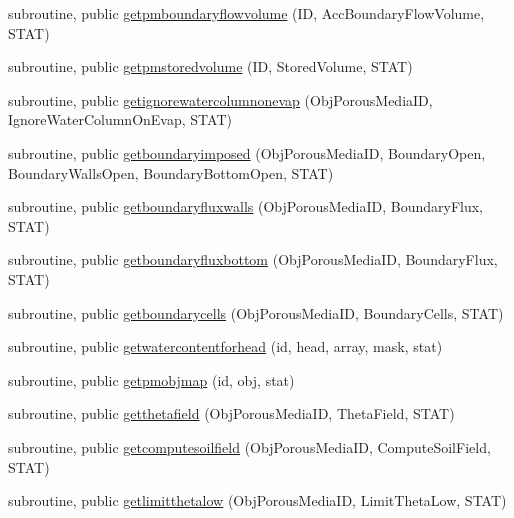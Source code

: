 \begin{DoxyCompactItemize}
\item 
subroutine, public \mbox{\hyperlink{namespacemoduleporousmedia_af76c86e60836074eb54ae108e4cbb7e5}{getpmboundaryflowvolume}} (ID, Acc\+Boundary\+Flow\+Volume, S\+T\+AT)
\item 
subroutine, public \mbox{\hyperlink{namespacemoduleporousmedia_a92e48a5d06b01af62070aecdf43d84e8}{getpmstoredvolume}} (ID, Stored\+Volume, S\+T\+AT)
\item 
subroutine, public \mbox{\hyperlink{namespacemoduleporousmedia_ab3b8a6941c7523cd30e46b5a95be57de}{getignorewatercolumnonevap}} (Obj\+Porous\+Media\+ID, Ignore\+Water\+Column\+On\+Evap, S\+T\+AT)
\item 
subroutine, public \mbox{\hyperlink{namespacemoduleporousmedia_a7ef0de747f82c7f61108e9f6033b260d}{getboundaryimposed}} (Obj\+Porous\+Media\+ID, Boundary\+Open, Boundary\+Walls\+Open, Boundary\+Bottom\+Open, S\+T\+AT)
\item 
subroutine, public \mbox{\hyperlink{namespacemoduleporousmedia_a50641f9d2c506813ba712d8f3ba6438d}{getboundaryfluxwalls}} (Obj\+Porous\+Media\+ID, Boundary\+Flux, S\+T\+AT)
\item 
subroutine, public \mbox{\hyperlink{namespacemoduleporousmedia_ad1e02ec3a85b11609df54fd2e561da0d}{getboundaryfluxbottom}} (Obj\+Porous\+Media\+ID, Boundary\+Flux, S\+T\+AT)
\item 
subroutine, public \mbox{\hyperlink{namespacemoduleporousmedia_a791a426544d46967cd83d7b81926e26a}{getboundarycells}} (Obj\+Porous\+Media\+ID, Boundary\+Cells, S\+T\+AT)
\item 
subroutine, public \mbox{\hyperlink{namespacemoduleporousmedia_ab9c801f3c5442ad39e9dcb57a60fe017}{getwatercontentforhead}} (id, head, array, mask, stat)
\item 
subroutine, public \mbox{\hyperlink{namespacemoduleporousmedia_ab411441ee4f139b7e2efb9f91cad1778}{getpmobjmap}} (id, obj, stat)
\item 
subroutine, public \mbox{\hyperlink{namespacemoduleporousmedia_a4733e16297b69cfac43e1f2f0cd30381}{getthetafield}} (Obj\+Porous\+Media\+ID, Theta\+Field, S\+T\+AT)
\item 
subroutine, public \mbox{\hyperlink{namespacemoduleporousmedia_ae3c2ce61a7783cf1653e19109914fe29}{getcomputesoilfield}} (Obj\+Porous\+Media\+ID, Compute\+Soil\+Field, S\+T\+AT)
\item 
subroutine, public \mbox{\hyperlink{namespacemoduleporousmedia_a3070d5af7ef46dbbb22e63098a25f566}{getlimitthetalow}} (Obj\+Porous\+Media\+ID, Limit\+Theta\+Low, S\+T\+AT)
\item 

\end{DoxyCompactItemize}
